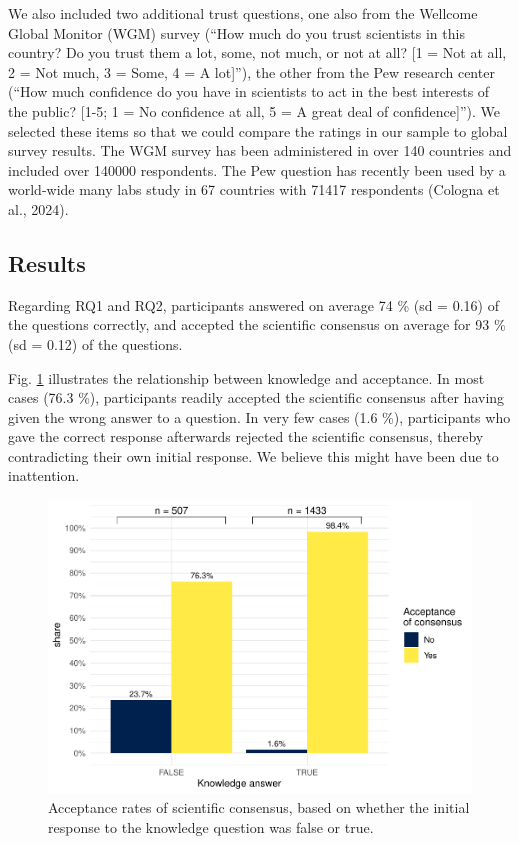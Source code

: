\documentclass[
  doc,floatsintext]{apa6}
\begin{document}
We also included two additional trust questions, one also from the Wellcome Global Monitor (WGM) survey (``How much do you trust scientists in this country? Do you trust them a lot, some, not much, or not at all? {[}1 = Not at all, 2 = Not much, 3 = Some, 4 = A lot{]}''), the other from the Pew research center (``How much confidence do you have in scientists to act in the best interests of the public? {[}1-5; 1 = No confidence at all, 5 = A great deal of confidence{]}''). We selected these items so that we could compare the ratings in our sample to global survey results. The WGM survey has been administered in over 140 countries and included over 140000 respondents. The Pew question has recently been used by a world-wide many labs study in 67 countries with 71417 respondents (Cologna et al., 2024).

\hypertarget{results}{%
\subsection{Results}\label{results}}

Regarding RQ1 and RQ2, participants answered on average 74 \% (sd = 0.16) of the questions correctly, and accepted the scientific consensus on average for 93 \% (sd = 0.12) of the questions.

Fig. \ref{fig:exp1-conditional-acceptance} illustrates the relationship between knowledge and acceptance. In most cases (76.3 \%), participants readily accepted the scientific consensus after having given the wrong answer to a question. In very few cases (1.6 \%), participants who gave the correct response afterwards rejected the scientific consensus, thereby contradicting their own initial response. We believe this might have been due to inattention.



\begin{figure}
\centering
\includegraphics{output/figures/exp1-conditional-acceptance.pdf}
\caption{\label{fig:exp1-conditional-acceptance}Acceptance rates of scientific consensus, based on whether the initial response to the knowledge question was false or true.}
\end{figure}
\end{document}
